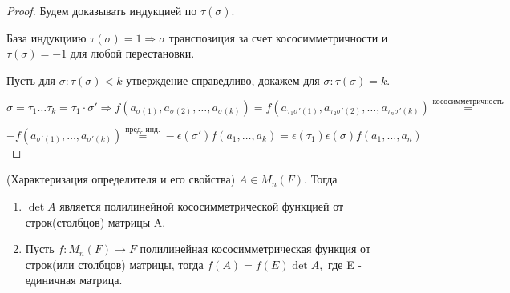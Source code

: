  \begin{proof}
 	Будем доказывать индукцией по \(\tau(\sigma)\). 
	
	База индукциию \(\tau(\sigma) = 1\Longrightarrow \sigma\) транспозиция за счет кососимметричности и \(\tau(\sigma) = - 1\) для любой перестановки. 
	
	Пусть для \(\sigma: \tau(\sigma)<k\) утверждение справедливо, докажем для $\sigma: \tau(\sigma) = k$. 
	
	\(\sigma = \tau_1 \ldots \tau_k = \tau_1\cdot\sigma' \Longrightarrow f(a_{\sigma(1)}, a_{\sigma(2)}, \ldots,a_{\sigma(k)}) = f(a_{\tau_1\sigma'(1)}, a_{\tau_2\sigma'(2)}, \ldots,a_{\tau_n\sigma'(k)})\overset{\text{кососимметричность}}{=}\)
	
	\(-f(a_{\sigma'(1)}, \ldots, a_{\sigma'(k)})\overset{\text{пред. инд.}}{=}-\epsilon(\sigma')f(a_1, \ldots, a_k) = \epsilon(\tau_1)\epsilon(\sigma)f(a_1, \ldots, a_n)\)
 \end{proof}
 \begin{theorem}
 	(Характеризация определителя и его свойства) \newline
 	\(A\in M_n(F)\). Тогда 
 	\begin{enumerate}
 		\item \(\det A\) является полилинейной кососимметрической функцией от строк(столбцов) матрицы A.
 		\item Пусть \(f:M_n(F)\to F\) полилинейная кососимметрическая функция от строк(или столбцов) матрицы, тогда \(f(A) = f(E)\det A,\) где E - единичная матрица.
  	\end{enumerate}
 \end{theorem}

